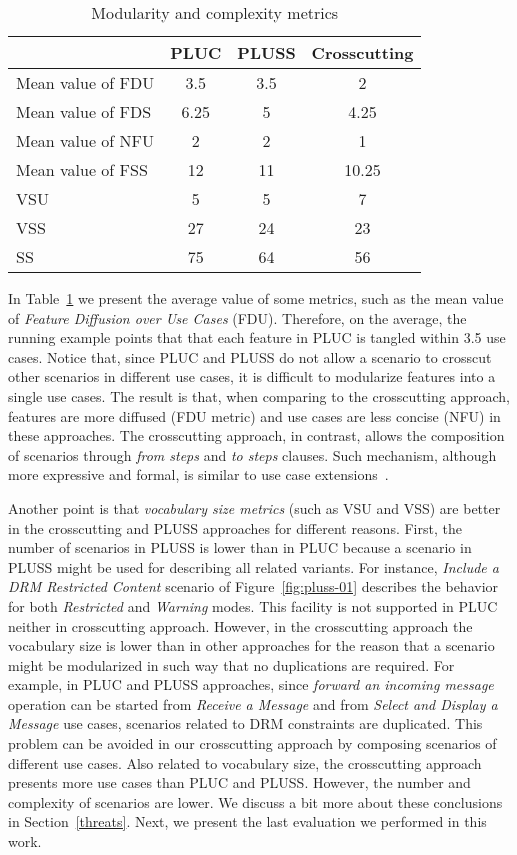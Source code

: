 \documentclass{acm_proc_article-sp}
\begin{document}
\begin{table}[hb]
\centering
\caption{Modularity and complexity metrics}
\label{tab:metrics}
\begin{tabular}{lccc} \hline
					& PLUC 	& PLUSS 	& Crosscutting	\\ \hline
Mean value of FDU 		& 3.5	& 3.5	& 2		\\
Mean value of FDS 		& 6.25	& 5		& 4.25	\\
Mean value of NFU 		& 2		& 2		& 1		\\
Mean value of FSS 		&12		& 11		& 10.25	\\ 
VSU 					& 5		& 5		& 7		\\
VSS 					& 27		& 24		& 23		\\
SS 					& 75		& 64		& 56		\\	\hline
\end{tabular}
\end{table}

In Table~\ref{tab:metrics} we present the average value 
of some metrics, such as the mean value of \emph{Feature Diffusion over Use Cases} (FDU). Therefore, on the average, the running 
example points that that each feature in PLUC is tangled within 3.5 use cases. Notice that, 
since PLUC and PLUSS do not allow a scenario to crosscut other scenarios in different use cases, it is difficult to modularize 
features into a single use cases. The result is that, when comparing to the crosscutting approach, features are more 
diffused (FDU metric) and use cases are less concise (NFU) in these approaches. 
The crosscutting approach, in contrast, allows the composition of scenarios through \emph{from steps} and \emph{to steps} clauses. 
Such mechanism, although more expressive and formal, is similar to use case extensions~\cite{jacobson-oose, jacobson-reuse-book, jacobson-aosd-book}.

Another point is that \emph{vocabulary size metrics} (such as VSU and VSS) are better in the crosscutting and PLUSS approaches for different reasons. First, the number of scenarios in PLUSS is lower than in PLUC because a scenario in PLUSS might be used for describing all related variants. For instance, \emph{Include a DRM Restricted Content} scenario of Figure~\ref{fig:pluss-01} describes the behavior for both \emph{Restricted} and \emph{Warning} modes. This facility is not supported in PLUC neither in crosscutting approach. However, in the crosscutting approach the vocabulary size is lower than in other approaches for the reason that a scenario might be modularized in such way that no duplications are required. For example, in PLUC and PLUSS approaches, since \emph{forward an incoming message} operation can be started from \emph{Receive a Message} and from \emph{Select and Display a Message} use cases, scenarios related to DRM constraints are duplicated. This problem can be avoided in our crosscutting approach by composing scenarios of different use cases.  
Also related to vocabulary size, the crosscutting approach presents more use cases than PLUC and PLUSS. However, 
the number and complexity of scenarios are lower. We discuss a bit more about these conclusions in Section~\ref{threats}. Next, 
we present the last evaluation we performed in this work.
\end{document}
